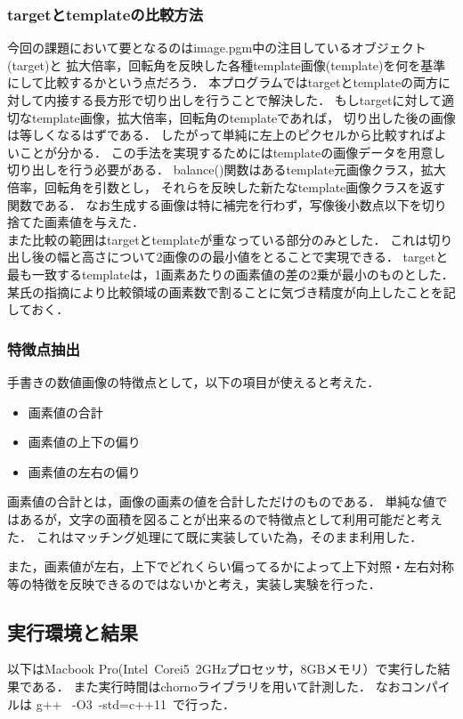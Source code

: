\documentclass[uplatex,dvipdfmx]{jsarticle}
\begin{document}
\subsubsection{targetとtemplateの比較方法}
今回の課題において要となるのはimage.pgm中の注目しているオブジェクト(target)と
拡大倍率，回転角を反映した各種template画像(template)を何を基準にして比較するかという点だろう．
本プログラムではtargetとtemplateの両方に対して内接する長方形で切り出しを行うことで解決した．
もしtargetに対して適切なtemplate画像，拡大倍率，回転角のtemplateであれば，
切り出した後の画像は等しくなるはずである．
したがって単純に左上のピクセルから比較すればよいことが分かる．
この手法を実現するためにはtemplateの画像データを用意し切り出しを行う必要がある．
balance()関数はあるtemplate元画像クラス，拡大倍率，回転角を引数とし，
それらを反映した新たなtemplate画像クラスを返す関数である．
なお生成する画像は特に補完を行わず，写像後小数点以下を切り捨てた画素値を与えた．\\



また比較の範囲はtargetとtemplateが重なっている部分のみとした．
これは切り出し後の幅と高さについて2画像のの最小値をとることで実現できる．
targetと最も一致するtemplateは，1画素あたりの画素値の差の2乗が最小のものとした．
某氏の指摘により比較領域の画素数で割ることに気づき精度が向上したことを記しておく．

\subsubsection{特徴点抽出}
手書きの数値画像の特徴点として，以下の項目が使えると考えた．
\begin{itemize}
	\item{画素値の合計}
	\item{画素値の上下の偏り}
	\item{画素値の左右の偏り}
\end{itemize}
画素値の合計とは，画像の画素の値を合計しただけのものである．
単純な値ではあるが，文字の面積を図ることが出来るので特徴点として利用可能だと考えた．
これはマッチング処理にて既に実装していた為，そのまま利用した．

また，画素値が左右，上下でどれくらい偏ってるかによって上下対照・左右対称等の特徴を反映できるのではないかと考え，実装し実験を行った．

\subsection{実行環境と結果}
以下はMacbook Pro(Intel~Corei5~2GHzプロセッサ，8GBメモリ）で実行した結果である．
また実行時間はchornoライブラリを用いて計測した．
なおコンパイルは g++ ~-O3~-std=c++11~で行った．
\end{document}
